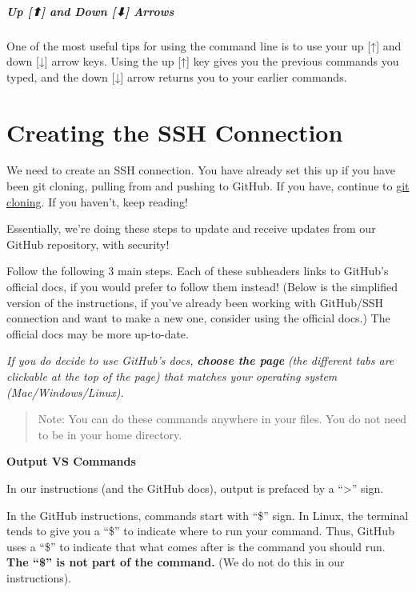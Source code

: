 \documentclass[
]{book}
\newenvironment{bluebox}{
  \definecolor{shadecolor}{RGB}{172, 210, 237}
  \color{white}
  \begin{shaded}}
 {\end{shaded}}
\theoremstyle{definition}
\theoremstyle{definition}
\theoremstyle{definition}
\theoremstyle{definition}
\theoremstyle{remark}
\begin{document}
\subparagraph*{Up {[}⬆{]} and Down {[}⬇{]} Arrows}\label{up-and-down-arrows}

One of the most useful tips for using the command line is to use your up {[}↑{]} and down {[}↓{]} arrow keys. Using the up {[}↑{]} key gives you the previous commands you typed, and the down {[}↓{]} arrow returns you to your earlier commands.

\section{Creating the SSH Connection}\label{creating-the-ssh-connection}

We need to create an SSH connection. You have already set this up if you have been git cloning, pulling from and pushing to GitHub. If you have, continue to \hyperref[git-clone]{git cloning}. If you haven't, keep reading!

Essentially, we're doing these steps to update and receive updates from our GitHub repository, with security!

Follow the following 3 main steps. Each of these subheaders links to GitHub's official docs, if you would prefer to follow them instead! (Below is the simplified version of the instructions, if you've already been working with GitHub/SSH connection and want to make a new one, consider using the official docs.) The official docs may be more up-to-date.

\emph{If you do decide to use GitHub's docs,} \textbf{\emph{choose the page}} \emph{(the different tabs are clickable at the top of the page) that matches your operating system (Mac/Windows/Linux).}

\begin{quote}
Note: You can do these commands anywhere in your files. You do not need to be in your home directory.
\end{quote}

\begin{bluebox}

\begin{center}
\textbf{Output VS Commands}

\end{center}

In our instructions (and the GitHub docs), output is prefaced by a ``\textgreater{}'' sign.

In the GitHub instructions, commands start with ``\$'' sign. In Linux, the terminal tends to give you a ``\$'' to indicate where to run your command. Thus, GitHub uses a ``\$'' to indicate that what comes after is the command you should run. \textbf{The ``\$'' is not part of the command.} (We do not do this in our instructions).

\end{bluebox}
\end{document}
